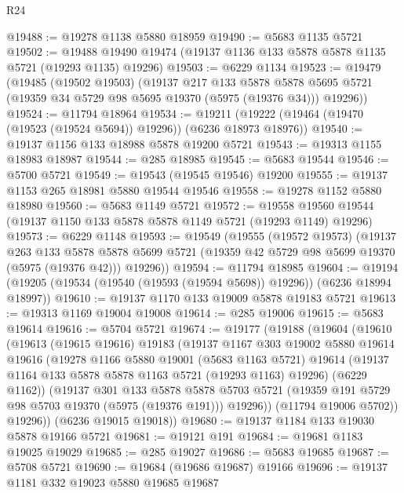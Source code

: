 \begin{lexlean}{R24}
\begin{coremodule}
@19488 := @19278 @1138 @5880 @18959
@19490 := @5683 @1135 @5721
@19502 := @19488 @19490 @19474 (@19137 @1136 @133 @5878 @5878 @1135 @5721 (@19293 @1135) @19296)
@19503 := @6229 @1134
@19523 := @19479
    (@19485
      (@19502 @19503)
      (@19137
        @217
        @133
        @5878
        @5878
        @5695
        @5721
        (@19359 @34 @5729 @98 @5695 @19370 (@5975 (@19376 @34)))
        @19296))
@19524 := @11794 @18964
@19534 := @19211 (@19222 (@19464 (@19470 (@19523 (@19524 @5694)) @19296)) (@6236 @18973 @18976))
@19540 := @19137 @1156 @133 @18988 @5878 @19200 @5721
@19543 := @19313 @1155 @18983 @18987
@19544 := @285 @18985
@19545 := @5683 @19544
@19546 := @5700 @5721
@19549 := @19543 (@19545 @19546) @19200
@19555 := @19137 @1153 @265 @18981 @5880 @19544 @19546
@19558 := @19278 @1152 @5880 @18980
@19560 := @5683 @1149 @5721
@19572 := @19558 @19560 @19544 (@19137 @1150 @133 @5878 @5878 @1149 @5721 (@19293 @1149) @19296)
@19573 := @6229 @1148
@19593 := @19549
    (@19555
      (@19572 @19573)
      (@19137
        @263
        @133
        @5878
        @5878
        @5699
        @5721
        (@19359 @42 @5729 @98 @5699 @19370 (@5975 (@19376 @42)))
        @19296))
@19594 := @11794 @18985
@19604 := @19194 (@19205 (@19534 (@19540 (@19593 (@19594 @5698)) @19296)) (@6236 @18994 @18997))
@19610 := @19137 @1170 @133 @19009 @5878 @19183 @5721
@19613 := @19313 @1169 @19004 @19008
@19614 := @285 @19006
@19615 := @5683 @19614
@19616 := @5704 @5721
@19674 := @19177
    (@19188
      (@19604
        (@19610
          (@19613
            (@19615 @19616)
            @19183
            (@19137
              @1167
              @303
              @19002
              @5880
              @19614
              @19616
              (@19278
                @1166
                @5880
                @19001
                (@5683 @1163 @5721)
                @19614
                (@19137 @1164 @133 @5878 @5878 @1163 @5721 (@19293 @1163) @19296)
                (@6229 @1162))
              (@19137
                @301
                @133
                @5878
                @5878
                @5703
                @5721
                (@19359 @191 @5729 @98 @5703 @19370 (@5975 (@19376 @191)))
                @19296))
            (@11794 @19006 @5702))
          @19296))
      (@6236 @19015 @19018))
@19680 := @19137 @1184 @133 @19030 @5878 @19166 @5721
@19681 := @19121 @191
@19684 := @19681 @1183 @19025 @19029
@19685 := @285 @19027
@19686 := @5683 @19685
@19687 := @5708 @5721
@19690 := @19684 (@19686 @19687) @19166
@19696 := @19137 @1181 @332 @19023 @5880 @19685 @19687

\end{coremodule}
\end{lexlean}
